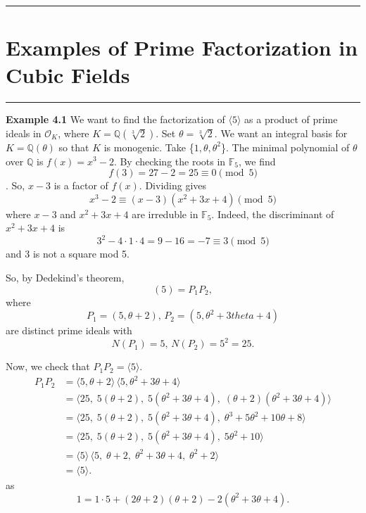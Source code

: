 \medskip 
{\color{gray}\hrule}
\section{Examples of Prime Factorization in Cubic Fields}
\medskip 
{\color{gray}\hrule}
\medskip



\begin{flushleft}
    \quad\textbf{Example 4.1} We want to find the factorization of $\langle 5 \rangle$ as a product of prime ideals in $\mathcal{O}_K$, where $K=\mathbb{Q}(\sqrt[3]{2})$.
    Set $\theta = \sqrt[3]{2}.$ We want an integral basis for $K=\mathbb{Q}(\theta)$ so that $K$ is monogenic. Take \{${1, \theta, \theta ^2}$\}.
    The minimal polynomial of $\theta$ over $\mathbb{Q}$ is $f(x)=x^3-2$. 
    By checking the roots in $\mathbb{F}_5$, we find
    \[
    f(3)=27-2=25 \equiv 0 \pmod{5}
    \]. So, $x-3$ is a factor of $f(x)$. Dividing gives
    \[
    x^3-2 \equiv (x-3)(x^2+3x+4) \pmod{5}
    \]
    where $x-3$ and $x^2+3x+4$ are irreduble in $\mathbb{F}_5$. Indeed, the discriminant of $x^2+3x+4$ is 
    \[
    3^2-4 \cdot 1 \cdot 4 = 9-16 = -7 \equiv 3 \pmod{5}
    \] 
    and 3 is not a square mod 5.

    So, by Dedekind's theorem,
    \[
    (5)=P_1P_2,
    \]
    where
    \[
    P_1=(5, \theta +2) \text{, } P_2=(5, \theta^2+3theta+4)
    \]
    are distinct prime ideals with 
    \[
    N(P_1)=5 \text{, } N(P_2)=5^2=25.
    \]

    Now, we check that $P_1 P_2 = \langle 5 \rangle$.
    \begin{align*}
    P_1 P_2 
    &= \langle 5, \theta + 2 \rangle \, \langle 5, \theta^2 + 3\theta + 4 \rangle \\
    &= \langle 25,\; 5(\theta + 2),\; 5(\theta^2 + 3\theta + 4),\; (\theta + 2)(\theta^2 + 3\theta + 4) \rangle \\
    &= \langle 25,\; 5(\theta + 2),\; 5(\theta^2 + 3\theta + 4),\; \theta^3 + 5\theta^2 + 10\theta + 8 \rangle \\
    &= \langle 25,\; 5(\theta + 2),\; 5(\theta^2 + 3\theta + 4),\; 5\theta^2 + 10 \rangle \\
    &= \langle 5 \rangle \, \langle 5,\; \theta + 2,\; \theta^2 + 3\theta + 4,\; \theta^2 + 2 \rangle \\
    &= \langle 5 \rangle.
    \end{align*}
    as
    \[
    1 = 1 \cdot 5 +(2 \theta +2)(\theta +2)-2(\theta ^2 +3 \theta +4).
    \]


\end{flushleft}
